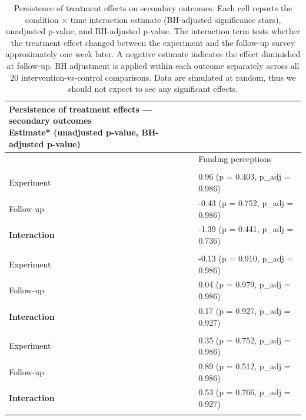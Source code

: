 \documentclass[
  letterpaper,
  DIV=11,
  numbers=noendperiod]{scrartcl}
\begin{document}
\begin{longtable}{l|l}

\caption{\label{tbl-persistence-secondary}Persistence of treatment
effects on secondary outcomes. Each cell reports the condition × time
interaction estimate (BH-adjusted significance stars), unadjusted
p-value, and BH-adjusted p-value. The interaction term tests whether the
treatment effect changed between the experiment and the follow-up survey
approximately one week later. A negative estimate indicates the effect
diminished at follow-up. BH adjustment is applied within each outcome
separately across all 20 intervention-vs-control comparisons. Data are
simulated at random, thus we should not expect to see any significant
effects.}

\tabularnewline

\caption*{
{\large Persistence of treatment effects — secondary outcomes} \\ 
{\small Estimate* (unadjusted p-value, BH-adjusted p-value)}
} \\ 
\toprule
 & Funding perceptions \\ 
\midrule\addlinespace[2.5pt]
\multicolumn{2}{l}{{\bfseries intervention\_13}} \\[2.5pt] 
\midrule\addlinespace[2.5pt]
Experiment & {0.96 (p = 0.403, p\_adj = 0.986)} \\ 
Follow-up & {-0.43 (p = 0.752, p\_adj = 0.986)} \\ 
{\bfseries Interaction} & {-1.39 (p = 0.441, p\_adj = 0.736)} \\ 
\midrule\addlinespace[2.5pt]
\multicolumn{2}{l}{{\bfseries intervention\_19}} \\[2.5pt] 
\midrule\addlinespace[2.5pt]
Experiment & {-0.13 (p = 0.910, p\_adj = 0.986)} \\ 
Follow-up & {0.04 (p = 0.979, p\_adj = 0.986)} \\ 
{\bfseries Interaction} & {0.17 (p = 0.927, p\_adj = 0.927)} \\ 
\midrule\addlinespace[2.5pt]
\multicolumn{2}{l}{{\bfseries intervention\_3}} \\[2.5pt] 
\midrule\addlinespace[2.5pt]
Experiment & {0.35 (p = 0.752, p\_adj = 0.986)} \\ 
Follow-up & {0.89 (p = 0.512, p\_adj = 0.986)} \\ 
{\bfseries Interaction} & {0.53 (p = 0.766, p\_adj = 0.927)} \\ 
\midrule\addlinespace[2.5pt]
\multicolumn{2}{l}{{\bfseries intervention\_5}} \\[2.5pt] 

\end{longtable}
\end{document}
